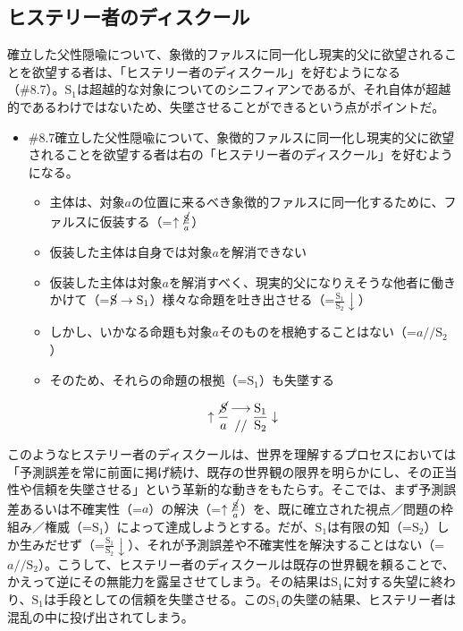 \subsection{ヒステリー者のディスクール}\label{ux30d2ux30b9ux30c6ux30eaux30fcux8005ux306eux30c7ux30a3ux30b9ux30afux30fcux30eb}

確立した父性隠喩について、象徴的ファルスに同一化し現実的父に欲望されることを欲望する者は、「ヒステリー者のディスクール」を好むようになる（\#8.7）。\(\textrm{S}_1\)は超越的な対象についてのシニフィアンであるが、それ自体が超越的であるわけではないため、失墜させることができるという点がポイントだ。

\begin{note}{}
  \begin{itemize}
    \tightlist
    \item{\#8.7}確立した父性隠喩について、象徴的ファルスに同一化し現実的父に欲望されることを欲望する者は右の「ヒステリー者のディスクール」を好むようになる。
      \begin{itemize}
        \tightlist
        \item 主体は、対象$a$の位置に来るべき象徴的ファルスに同一化するために、ファルスに仮装する（=$\uparrow\frac{\cancel{\textrm{S}}}{a}$）
        \item 仮装した主体は自身では対象$a$を解消できない
        \item 仮装した主体は対象$a$を解消すべく、現実的父になりえそうな他者に働きかけて（=$\cancel{\textrm{S}}\rightarrow\textrm{S}_1$）様々な命題を吐き出させる（=$\frac{\textrm{S}_1}{\textrm{S}_2}\downarrow$）
        \item しかし、いかなる命題も対象$a$そのものを根絶することはない（=$a//\textrm{S}_2$）
        \item そのため、それらの命題の根拠（=$\textrm{S}_1$）も失墜する
      \end{itemize}

$$
\uparrow\frac{\mathrm{\cancel{S}}}{a}\genfrac{}{}{0pt}{}{\longrightarrow}{//}\frac{\mathrm{S_1}}{\mathrm{S_2}}\downarrow
$$
  \end{itemize}
\end{note}

このようなヒステリー者のディスクールは、世界を理解するプロセスにおいては「予測誤差を常に前面に掲げ続け、既存の世界観の限界を明らかにし、その正当性や信頼を失墜させる」という革新的な動きをもたらす。そこでは、まず予測誤差あるいは不確実性（=\(a\)）の解決（=\(\uparrow\frac{\cancel{\textrm{S}}}{a}\)）を、既に確立された視点／問題の枠組み／権威（=\(\textrm{S}_1\)）によって達成しようとする。だが、\(\textrm{S}_1\)は有限の知（=\(\textrm{S}_2\)）しか生みだせず（=\(\frac{\textrm{S}_1}{\textrm{S}_2}\downarrow\)）、それが予測誤差や不確実性を解決することはない（=\(a//\textrm{S}_2\)）。こうして、ヒステリー者のディスクールは既存の世界観を頼ることで、かえって逆にその無能力を露呈させてしまう。その結果は\(\textrm{S}_1\)に対する失望に終わり、\(\textrm{S}_1\)は手段としての信頼を失墜させる。この\(\textrm{S}_1\)の失墜の結果、ヒステリー者は混乱の中に投げ出されてしまう。

